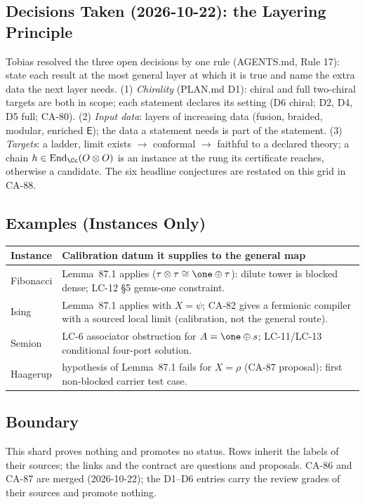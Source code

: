 \subsection{Decisions Taken (2026-10-22): the Layering Principle}

Tobias resolved the three open decisions by one rule (AGENTS.md, Rule 17):
state each result at the most general layer at which it is true and name the
extra data the next layer needs. (1) \emph{Chirality} (PLAN.md D1): chiral and
full two-chiral targets are both in scope; each statement declares its setting
(D6 chiral; D2, D4, D5 full; CA-80). (2) \emph{Input data}: layers of
increasing data (fusion, braided, modular, enriched \(\mathsf E\)); the data a
statement needs is part of the statement. (3) \emph{Targets}: a ladder, limit
exists \(\to\) conformal \(\to\) faithful to a declared theory; a chain
\(h\in\operatorname{End}_\Cc(O\otimes O)\) is an instance at the rung its
certificate reaches, otherwise a candidate. The six headline conjectures are
restated on this grid in CA-88.

\subsection{Examples (Instances Only)}

\begin{center}\footnotesize
\begin{tabular}{p{2.0cm}p{12.0cm}}
\toprule
Instance & Calibration datum it supplies to the general map \\
\midrule
Fibonacci & Lemma~87.1 applies (\(\tau\otimes\tau\cong\one\oplus\tau\)): dilute tower is blocked dense; LC-12 \S5 genus-one constraint. \\
Ising & Lemma~87.1 applies with \(X=\psi\); CA-82 gives a fermionic compiler with a sourced local limit (calibration, not the general route). \\
Semion & LC-6 associator obstruction for \(A=\one\oplus s\); LC-11/LC-13 conditional four-port solution. \\
Haagerup & hypothesis of Lemma~87.1 fails for \(X=\rho\) (CA-87 proposal): first non-blocked carrier test case. \\
\bottomrule
\end{tabular}
\end{center}

\subsection{Boundary}

This shard proves nothing and promotes no status.  Rows inherit the labels
of their sources; the links and the contract are questions and proposals.
CA-86 and CA-87 are merged (2026-10-22); the D1--D6 entries carry the
review grades of their sources and promote nothing.
